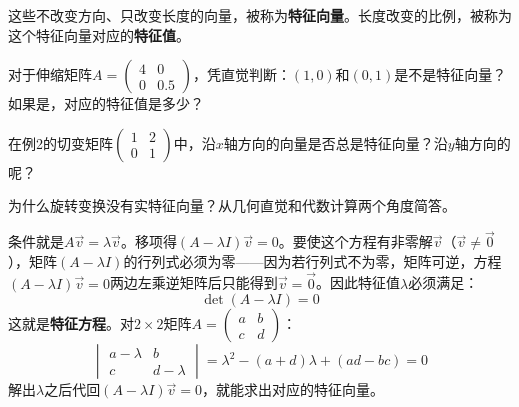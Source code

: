 这些不改变方向、只改变长度的向量，被称为\textbf{特征向量}。长度改变的比例，被称为这个特征向量对应的\textbf{特征值}。

\begin{exercise}
\item 对于伸缩矩阵$A=\begin{pmatrix}4&0\\0&0.5\end{pmatrix}$，凭直觉判断：$(1,0)$和$(0,1)$是不是特征向量？如果是，对应的特征值是多少？
\item 在例2的切变矩阵$\begin{pmatrix}1&2\\0&1\end{pmatrix}$中，沿$x$轴方向的向量是否总是特征向量？沿$y$轴方向的呢？
\item 为什么旋转变换没有实特征向量？从几何直觉和代数计算两个角度简答。
\end{exercise}


条件就是$A\vec v = \lambda\vec v$。移项得$(A-\lambda I)\vec v = 0$。要使这个方程有非零解$\vec v$（$\vec v\neq\vec 0$），矩阵$(A-\lambda I)$的行列式必须为零——因为若行列式不为零，矩阵可逆，方程$(A-\lambda I)\vec v=0$两边左乘逆矩阵后只能得到$\vec v = \vec 0$。因此特征值$\lambda$必须满足：
\[
\det(A-\lambda I) = 0
\]
这就是\textbf{特征方程}。对$2\times2$矩阵$A=\begin{pmatrix}a&b\\c&d\end{pmatrix}$：
\[
\begin{vmatrix}a-\lambda & b\\c & d-\lambda\end{vmatrix}
= \lambda^2-(a+d)\lambda+(ad-bc) = 0
\]
解出$\lambda$之后代回$(A-\lambda I)\vec v=0$，就能求出对应的特征向量。

